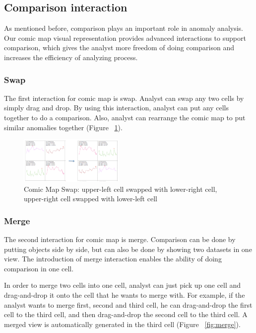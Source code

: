 \documentclass{vgtc}                          %
\begin{document}
\subsection{Comparison interaction}
As mentioned before, comparison plays an important role in anomaly analysis. Our comic map visual representation provides advanced interactions to support comparison, which gives the analyst more freedom of doing comparison and increases the efficiency of analyzing process.

\subsubsection{Swap}
The first interaction for comic map is swap. Analyst can swap any two cells by simply drag and drop. By using this interaction, analyst can put any cells together to do a comparison.  Also, analyst can rearrange the comic map to put similar anomalies together (Figure ~\ref{fig:swap}).

\begin{figure}[htb]
	\centering
	\includegraphics[width=0.45\textwidth]{swap.jpg}
	\caption{Comic Map Swap: upper-left cell swapped with lower-right cell, upper-right cell swapped with lower-left cell}
	\label{fig:swap}
\end{figure}

\subsubsection{Merge}
The second interaction for comic map is merge. Comparison can be done by putting objects side by side, but can also be done by showing two datasets in one view. The introduction of merge interaction enables the ability of doing comparison in one cell.

In order to merge two cells into one cell, analyst can just pick up one cell and drag-and-drop it onto the cell that he wants to merge with. For example, if the analyst wants to merge first, second and third cell, he can drag-and-drop the first cell to the third cell, and then drag-and-drop the second cell to the third cell. A merged view is automatically generated in the third cell (Figure ~\ref{fig:merge}).
\end{document}
